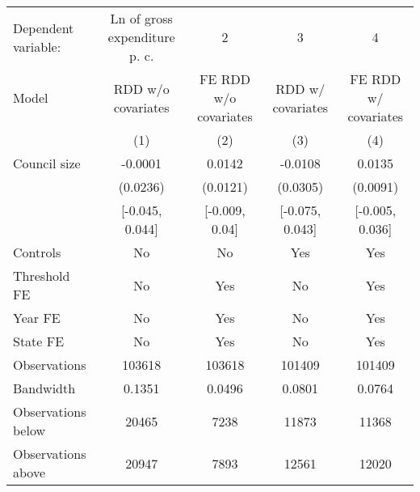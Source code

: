 \begin{tabular}{lcccc}
  \toprule
 \midrule
Dependent variable: & Ln of gross expenditure p. c. & 2 & 3 & 4 \\ 
 Model & RDD w/o covariates & FE RDD w/o covariates & RDD w/ covariates & FE RDD w/ covariates \\ 
   & (1) & (2) & (3) & (4) \\ 
   \midrule
Council size & -0.0001 & 0.0142 & -0.0108 & 0.0135 \\ 
   & (0.0236) & (0.0121) & (0.0305) & (0.0091) \\ 
   & [-0.045, 0.044] & [-0.009, 0.04] & [-0.075, 0.043] & [-0.005, 0.036] \\ 
   \midrule
Controls & No & No & Yes & Yes \\ 
  Threshold FE & No & Yes & No & Yes \\ 
  Year FE & No & Yes & No & Yes \\ 
  State FE & No & Yes & No & Yes \\ 
   \midrule
Observations & 103618 & 103618 & 101409 & 101409 \\ 
  Bandwidth & 0.1351 & 0.0496 & 0.0801 & 0.0764 \\ 
  Observations below & 20465 & 7238 & 11873 & 11368 \\ 
  Observations above & 20947 & 7893 & 12561 & 12020 \\ 
   \midrule
 \bottomrule
\end{tabular}
